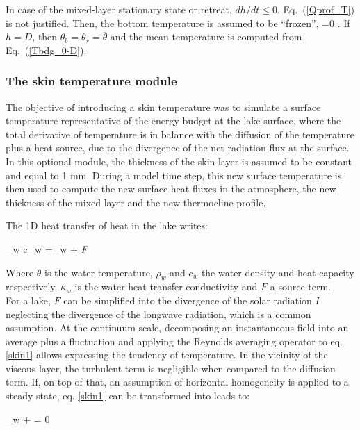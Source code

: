 In case of the mixed-layer stationary state or retreat, 
$dh/dt\le0$, Eq.~(\ref{Qprof_T}) is not justified. 
Then, the bottom temperature is assumed to be ``frozen'', 
%
\beq\label{Tb_dhdt_le_0}
=0 .
\eeq
%
If $h=D$, then $\theta_b=\theta_s=\overline{\theta}$ 
and the mean temperature is computed from Eq.~(\ref{Tbdg_0-D}). 


\subsubsection{The skin temperature module}
\nopagebreak 
%
\noindent
The objective of introducing a skin temperature was to simulate a surface temperature 
representative of the energy budget at the lake surface, where the total derivative of 
temperature is in balance with the diffusion of the temperature plus a heat source, due 
to the divergence of the net radiation flux at the surface. In this optional module, the 
thickness of the skin layer is assumed to be constant and equal to 1 mm. During a model 
time step, this new surface temperature is then used to compute the new surface heat fluxes 
in the atmosphere, the new thickness of the mixed layer and the new thermocline profile.

The 1D heat transfer of heat in the lake writes:

\beq\label{skin1}
\rho_w c_w =\kappa_w \nabla{\theta} + {\it{F}}
\eeq

Where $\theta$ is the water temperature, $\rho_w$ and $c_w$ the water density and heat capacity respectively,
$\kappa_w$ is the water heat transfer conductivity and $F$ a source term.\\

For a lake, {\it{$F$}} can be simplified into the divergence of the solar radiation {\it{$I$}} 
neglecting the divergence of the longwave radiation, which is a common assumption. At the 
continuum scale, decomposing an instantaneous field into an average plus a fluctuation and 
applying the Reynolds averaging operator to eq. \ref{skin1} allows expressing the tendency of
temperature. In the vicinity of the viscous layer, the turbulent term is negligible when 
compared to the diffusion term. If, on top of that, an assumption of horizontal homogeneity 
is applied to a steady state, eq. \ref{skin1} can be transformed into 
leads to:

\beq\label{skin2}
\kappa_w  +  = 0
\eeq

